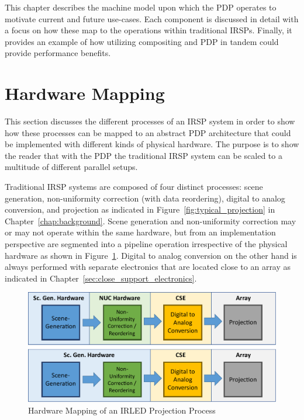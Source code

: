 \label{chap:machine_model}
This chapter describes the machine model upon which the PDP operates to motivate current and future use-cases. Each component is discussed in detail with a focus on how these map to the operations within traditional IRSPs. Finally, it provides an example of how utilizing compositing and PDP in tandem could provide performance benefits.

\section{Hardware Mapping}
    This section discusses the different processes of an IRSP system in order to show how these processes can be mapped to an abstract PDP architecture that could be implemented with different kinds of physical hardware. The purpose is to show the reader that with the PDP the traditional IRSP system can be scaled to a multitude of different parallel setups.

    Traditional IRSP systems are composed of four distinct processes: scene generation, non-uniformity correction (with data reordering), digital to analog conversion, and projection as indicated in Figure~\ref{fig:typical_projection} in Chapter~\ref{chap:background}. Scene generation and non-uniformity correction may or may not operate within the same hardware, but from an implementation perspective are segmented into a pipeline operation irrespective of the physical hardware as shown in Figure~\ref{fig:typical_projection_hardware}. Digital to analog conversion on the other hand is always performed with separate electronics that are located close to an array as indicated in Chapter~\ref{sec:close_support_electronics}.

    \begin{figure}
        \centering
        \includegraphics[width=1.0\textwidth]{fig/typical_projection_system_hardware.pdf}
        \caption{Hardware Mapping of an IRLED Projection Process}
        \label{fig:typical_projection_hardware}
    \end{figure}

